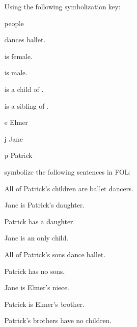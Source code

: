 \begin{practiceproblems}
\solutions
\problempart
\label{pr.FOLballet}
Using the following symbolization key:
\begin{ekey}
\item[\text{domain}] people
\item[\atom{D}{x}]  dances ballet.
\item[\atom{F}{x}]  is female.
\item[\atom{M}{x}]  is male.
\item[\atom{C}{x,y}]  is a child of .
\item[\atom{S}{x,y}]  is a sibling of .
\item[e] Elmer
\item[j] Jane
\item[p] Patrick
\end{ekey}
symbolize the following sentences in FOL:
\begin{earg}
\item All of Patrick's children are ballet dancers.
\item[] 
\item Jane is Patrick's daughter.
\item[] 
\item Patrick has a daughter.
\item[] 
\item Jane is an only child.
\item[] 
\item All of Patrick's sons dance ballet.
\item[] 
\item Patrick has no sons.
\item[] 
\item Jane is Elmer's niece.
\item[] 
\item Patrick is Elmer's brother.
\item[] 
\item Patrick's brothers have no children.
\item[] 

\end{earg}
\end{practiceproblems}
